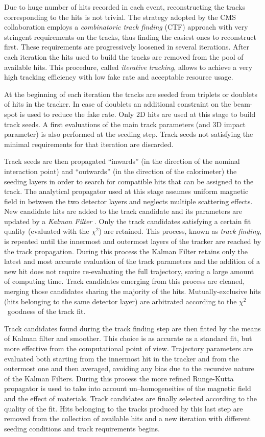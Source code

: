 Due to huge number of hits recorded in each event, reconstructing the tracks corresponding to the hits is not trivial. The strategy adopted by the CMS collaboration employs a \emph{combinatoric track finding} (CTF) approach with very stringent requirements on the tracks, thus finding the easiest ones to reconstruct first. These requirements are progressively loosened in several iterations. After each iteration the hits used to build the tracks are removed from the pool of available hits. This procedure, called \emph{iterative tracking}, allows to achieve a very high tracking efficiency with low fake rate and acceptable resource usage. 

At the beginning of each iteration the tracks are seeded from triplets or doublets of hits in the tracker. In case of doublets an additional constraint on the beam-spot is used to reduce the fake rate. Only 2D hits are used at this stage to build track seeds. A first evaluations of the main track parameters (\pT and 3D impact parameter) is also performed at the seeding step. Track seeds not satisfying the minimal requirements for that iteration are discarded.

Track seeds are then propagated ``inwards'' (in the direction of the nominal interaction point) and ``outwards'' (in the direction of the calorimeter) the seeding layers in order to search for compatible hits that can be assigned to the track. The analytical propagator used at this stage assumes uniform magnetic field in between the two detector layers and neglects multiple scattering effects. New candidate hits are added to the track candidate and its parameters are updated by a \emph{Kalman Filter} \cite{Fruhwirth:1987fm}. Only the track candidates satisfying a certain fit quality (evaluated with the $\chi^2$) are retained. This process, known as \emph{track finding}, is repeated until the innermost and outermost layers of the tracker are reached by the track propagation. During this process the Kalman Filter retains only the latest and most accurate evaluation of the track parameters and the addition of a new hit does not require re-evaluating the full trajectory, saving a large amount of computing time. Track candidates emerging from this process are cleaned, merging those candidates sharing the majority of the hits. Mutually-exclusive hits (hits belonging to the same detector layer) are arbitrated according to the $\chi^2$\ goodness of the track fit.

Track candidates found during the track finding step are then fitted by the means of Kalman filter and smoother. This choice is as accurate as a standard fit, but more effective from the computational point of view. Trajectory parameters are evaluated both starting from the innermost hit in the tracker and from the outermost one and then averaged, avoiding any bias due to the recursive nature of the Kalman Filters. During this process the more refined Runge-Kutta propagator is used to take into account un--homogeneities of the magnetic field and the effect of materials. Track candidates are finally selected according to the quality of the fit. Hits belonging to the tracks produced by this last step are removed from the collection of available hits and a new iteration with different seeding conditions and track requirements begins. 

